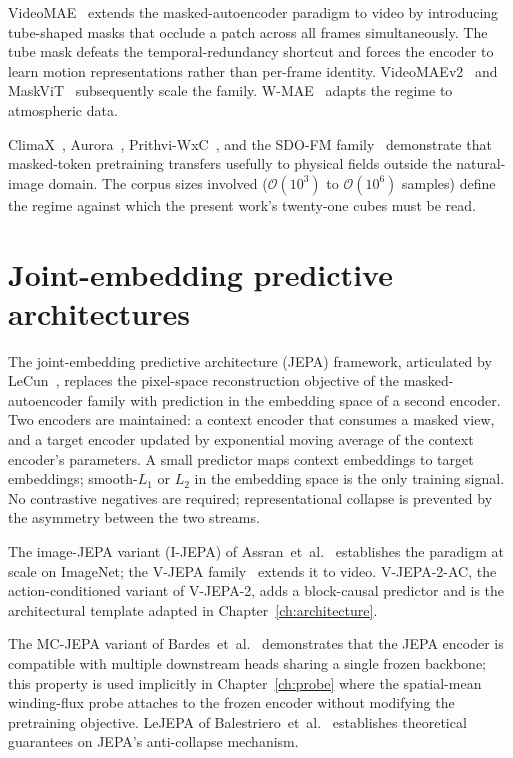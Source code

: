 VideoMAE~\cite{tong2022videomae} extends the masked-autoencoder
paradigm to video by introducing tube-shaped masks that occlude a
patch across all frames simultaneously. The tube mask defeats the
temporal-redundancy shortcut and forces the encoder to learn motion
representations rather than per-frame identity.
VideoMAEv2~\cite{wang2023videomaev2} and
MaskViT~\cite{gupta2022maskvit} subsequently scale the family.
W-MAE~\cite{wmae2023} adapts the regime to atmospheric data.

ClimaX~\cite{nguyen2023climax}, Aurora~\cite{bodnar2024aurora},
Prithvi-WxC~\cite{schmude2024prithviwxc}, and the
SDO-FM family~\cite{sdofm2024} demonstrate that masked-token
pretraining transfers usefully to physical fields outside the
natural-image domain. The corpus sizes involved
($\mathcal{O}(10^{3})$ to $\mathcal{O}(10^{6})$ samples) define the
regime against which the present work's twenty-one cubes must be
read.

\section{Joint-embedding predictive architectures}
\label{sec:bg-jepa}

The joint-embedding predictive architecture (JEPA) framework,
articulated by LeCun~\cite{lecun2022path}, replaces the
pixel-space reconstruction objective of the masked-autoencoder
family with prediction in the embedding space of a second encoder.
Two encoders are maintained: a context encoder that consumes a
masked view, and a target encoder updated by exponential moving
average of the context encoder's parameters. A small predictor maps
context embeddings to target embeddings; smooth-$L_{1}$ or
$L_{2}$ in the embedding space is the only training signal. No
contrastive negatives are required; representational collapse is
prevented by the asymmetry between the two streams.

The image-JEPA variant (I-JEPA) of
Assran~et~al.~\cite{assran2023ijepa} establishes the paradigm at
scale on ImageNet; the V-JEPA family~\cite{assran2024vjepa,
vjepa2_2025,vjepa21_2026} extends it to video. V-JEPA-2-AC, the
action-conditioned variant of V-JEPA-2, adds a block-causal
predictor and is the architectural template adapted in
Chapter~\ref{ch:architecture}.

The MC-JEPA variant of Bardes~et~al.~\cite{bardes2023mcjepa}
demonstrates that the JEPA encoder is compatible with multiple
downstream heads sharing a single frozen backbone; this property
is used implicitly in Chapter~\ref{ch:probe} where the spatial-mean
winding-flux probe attaches to the frozen encoder without
modifying the pretraining objective. LeJEPA of
Balestriero~et~al.~\cite{balestriero2025lejepa} establishes
theoretical guarantees on JEPA's anti-collapse mechanism.

